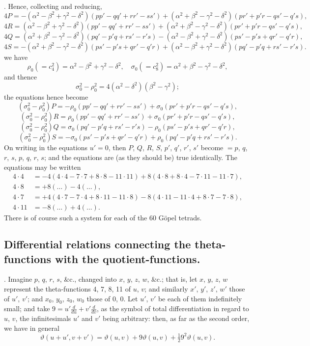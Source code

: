 \documentclass[12pt]{article}
\theoremstyle{plain}
\begin{document}
\newpage
\setcounter{page}{557}

. Hence, collecting and reducing,
\[
4P = -(\alpha^2 - \beta^2 + \gamma^2 - \delta^2)(pp' - qq' + rr' - ss') + (\alpha^2 + \beta^2 - \gamma^2 - \delta^2)(pr' + p'r - qs' - q's),
\]
\[
4R = (\alpha^2 - \beta^2 + \gamma^2 - \delta^2)(pp' - qq' + rr' - ss') + (\alpha^2 + \beta^2 - \gamma^2 - \delta^2)(pr' + p'r - qs' - q's),
\]
\[
4Q = (\alpha^2 + \beta^2 - \gamma^2 - \delta^2)(pq' - p'q + rs' - r's) - (\alpha^2 - \beta^2 + \gamma^2 - \delta^2)(ps' - p's + qr' - q'r),
\]
\[
4S = -(\alpha^2 + \beta^2 - \gamma^2 - \delta^2)(ps' - p's + qr' - q'r) + (\alpha^2 - \beta^2 + \gamma^2 - \delta^2)(pq' - p'q + rs' - r's).
\]
we have
\[
\rho_0 (= c_4^2) = \alpha^2 - \beta^2 + \gamma^2 - \delta^2,\quad \sigma_0 (= c_8^2) = \alpha^2 + \beta^2 - \gamma^2 - \delta^2,
\]
and thence
\[
\sigma_0^2 - \rho_0^2 = 4(\alpha^2 - \delta^2)(\beta^2 - \gamma^2);
\]
the equations hence become
\[
(\sigma_0^2 - \rho_0^2) P = -\rho_0(pp' - qq' + rr' - ss') + \sigma_0(pr' + p'r - qs' - q's),
\]
\[
(\sigma_0^2 - \rho_0^2) R = \rho_0(pp' - qq' + rr' - ss') + \sigma_0(pr' + p'r - qs' - q's),
\]
\[
(\sigma_0^2 - \rho_0^2) Q = \sigma_0(pq' - p'q + rs' - r's) - \rho_0(ps' - p's + qr' - q'r),
\]
\[
(\sigma_0^2 - \rho_0^2) S = -\sigma_0(ps' - p's + qr' - q'r) + \rho_0(pq' - p'q + rs' - r's).
\]
On writing in the equations $u' = 0$, then $P$, $Q$, $R$, $S$, $p'$, $q'$, $r'$, $s'$ become $= p$, $q$, $r$, $s$, $p$, $q$, $r$, $s$; and the equations are (as they should be) true identically. The equations may be written
\[
\begin{aligned}
4 \cdot 4 &= -4(4 \cdot 4 - 7 \cdot 7 + 8 \cdot 8 - 11 \cdot 11) + 8(4 \cdot 8 + 8 \cdot 4 - 7 \cdot 11 - 11 \cdot 7),\\
4 \cdot 8 &= +8(\dots) - 4(\dots),\\
4 \cdot 7 &= +4(4 \cdot 7 - 7 \cdot 4 + 8 \cdot 11 - 11 \cdot 8) - 8(4 \cdot 11 - 11 \cdot 4 + 8 \cdot 7 - 7 \cdot 8),\\
4 \cdot 11 &= -8(\dots) + 4(\dots).
\end{aligned}
\]
There is of course such a system for each of the 60 G\"opel tetrads.

\subsection*{Differential relations connecting the theta-functions with the quotient-functions.}

. Imagine $p$, $q$, $r$, $s$, \&c., changed into $x$, $y$, $z$, $w$, \&c.; that is, let $x$, $y$, $z$, $w$ represent the theta-functions 4, 7, 8, 11 of $u$, $v$; and similarly $x'$, $y'$, $z'$, $w'$ those of $u'$, $v'$; and $x_0$, $y_0$, $z_0$, $w_0$ those of $0$, $0$. Let $u'$, $v'$ be each of them indefinitely small; and take $9 = u' \frac{d}{du} + v' \frac{d}{dv}$, as the symbol of total differentiation in regard to $u$, $v$, the infinitesimals $u'$ and $v'$ being arbitrary: then, as far as the second order, we have in general
\[
\vartheta(u+u', v+v') = \vartheta(u,v) + 9\vartheta(u,v) + \tfrac12 9^2 \vartheta(u,v).
\]
\end{document}
